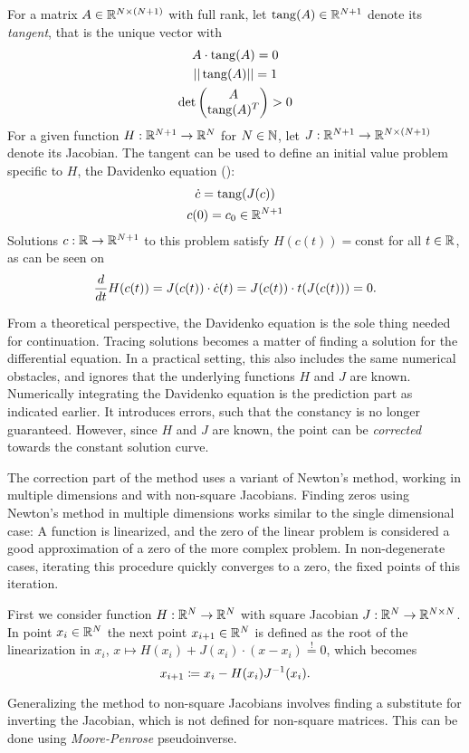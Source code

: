 For a matrix $A \in \mathbb{R}^{N \times (N+1)}$ with full rank, let $\operatorname{tang}(A) \in \mathbb{R}^{N+1}$ denote its \emph{tangent}, that is the unique vector with
	\begin{gather*}
		\displaystyle A \cdot \operatorname{tang}(A) = 0\\
		\displaystyle ||\operatorname{tang}(A)|| = 1\\
		\displaystyle \det \begin{pmatrix}
			A\\
			\operatorname{tang}(A)^T
		\end{pmatrix} > 0
	\end{gather*}
For a given function $H: \mathbb{R}^{N+1} \to \mathbb{R}^N$ for $N \in \mathbb{N}$, let $J: \mathbb{R}^{N+1} \to \mathbb{R}^{N \times (N+1)}$ denote its Jacobian.
The tangent can be used to define an initial value problem specific to $H$, the Davidenko equation (\cite{davidenko1953new}): %
	\begin{gather*}
		\displaystyle \dot c = \tang(J(c))\\ %
		\displaystyle c(0) = c_0 \in \R^{N+1}
	\end{gather*}
Solutions $c: \mathbb{R} \to \mathbb{R}^{N+1}$ to this problem satisfy $H(c(t)) = \text{const}$ for all $t \in \mathbb{R}$, as can be seen on
	\[
		\frac{d}{dt} H(c(t)) = J(c(t)) \cdot \dot c(t) = J(c(t)) \cdot t(J(c(t))) = 0 \text.
	\]

From a theoretical perspective, the Davidenko equation is the sole thing needed for continuation.
Tracing solutions becomes a matter of finding a solution for the differential equation.
In a practical setting, this also includes the same numerical obstacles, and ignores that the underlying functions $H$ and $J$ are known.
Numerically integrating the Davidenko equation is the prediction part as indicated earlier.
It introduces errors, such that the constancy is no longer guaranteed.
However, since $H$ and $J$ are known, the point can be \emph{corrected} towards the constant solution curve.

The correction part of the method uses a variant of Newton's method, working in multiple dimensions and with non-square Jacobians.
Finding zeros using Newton's method in multiple dimensions works similar to the single dimensional case: A function is linearized, and the zero of the linear problem is considered a good approximation of a zero of the more complex problem.
In non-degenerate cases, iterating this procedure quickly converges to a zero, the fixed points of this iteration.

First we consider function $H: \mathbb{R}^N \to \mathbb{R}^N$ with square Jacobian $J: \mathbb{R}^N \to \mathbb{R}^{N \times N}$.
In point $x_i \in \mathbb{R}^N$ the next point $x_{i+1} \in \mathbb{R}^N$ is defined as the root of the linearization in $x_i$, $x \mapsto H(x_i) + J(x_i) \cdot (x - x_i) \stackrel!= 0$, which becomes
	\[
		x_{i+1} \coloneqq x_i - H(x_i) J^{-1}(x_i) \text.
	\]

Generalizing the method to non-square Jacobians involves finding a substitute for inverting the Jacobian, which is not defined for non-square matrices.
This can be done using \emph{Moore-Penrose} pseudoinverse.



